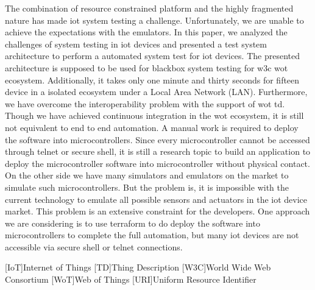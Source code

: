 \documentclass[conference]{IEEEtran}
\theoremstyle{definition}
\begin{document}
The combination of resource constrained platform and the highly fragmented nature has made \ac{iot} system testing a challenge.
Unfortunately, we are unable to achieve the expectations with the emulators.
In this paper, we analyzed the challenges of system testing in \ac{iot} devices and presented a test system architecture to perform a automated system test for \ac{iot} devices.
The presented architecture is supposed to be used for blackbox system testing for \ac{w3c} \ac{wot} ecosystem. Additionally, it takes only one minute and thirty seconds for fifteen device in a isolated ecosystem under a Local Area Network (LAN).
Furthermore, we have overcome the interoperability problem with the support of \ac{wot} \ac{td}.
Though we have achieved continuous integration in the \ac{wot} ecosystem, it is still not equivalent to end to end automation.
A manual work is required to deploy the software into microcontrollers. 
Since every microcontroller cannot be accessed through telnet or secure shell, it is still a research topic to build an application to deploy the microcontroller software into microcontroller without physical contact. 
On the other side we have many simulators and emulators on the market to simulate such microcontrollers. 
But the problem is, it is impossible with the current technology to emulate all possible sensors and actuators in the \ac{iot} device market. 
This problem is an extensive constraint for the developers.
One approach we are considering is to use terraform to do deploy the software into microcontrollers to complete the full automation, but many \ac{iot} devices are not accessible via secure shell or telnet connections.  



\begin{acronym}[ECU]
[IoT]{Internet of Things}
[TD]{Thing Description}
[W3C]{World Wide Web Consortium}
[WoT]{Web of Things}
[URI]{Uniform Resource Identifier}
\end{acronym}

%



\end{document}
